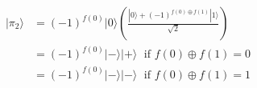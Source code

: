 \documentclass[preview]{standalone}
\begin{document}
\begin{align*}
|\pi_2\rangle &= (-1)^{f(0)}|0\rangle \left( \frac{|0\rangle + (-1)^{f(0)\oplus f(1)} |1\rangle}{\sqrt{2}}\right) \\ &= (-1)^{f(0)}|-\rangle |+\rangle \; \text{ if } f(0) \oplus f(1) = 0 \\ &= (-1)^{f(0)} |-\rangle |-\rangle \; \text{ if } f(0) \oplus f(1) = 1
\end{align*}
\end{document}

